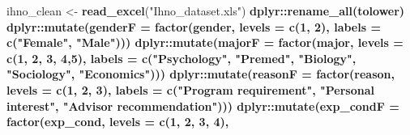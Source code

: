 \documentclass[
]{article}
\newenvironment{Shaded}{\begin{snugshade}}{\end{snugshade}}
\newcommand{\DataTypeTok}[1]{\textcolor[rgb]{0.13,0.29,0.53}{#1}}
\newcommand{\DecValTok}[1]{\textcolor[rgb]{0.00,0.00,0.81}{#1}}
\newcommand{\KeywordTok}[1]{\textcolor[rgb]{0.13,0.29,0.53}{\textbf{#1}}}
\newcommand{\NormalTok}[1]{#1}
\newcommand{\OperatorTok}[1]{\textcolor[rgb]{0.81,0.36,0.00}{\textbf{#1}}}
\newcommand{\StringTok}[1]{\textcolor[rgb]{0.31,0.60,0.02}{#1}}
\begin{document}
\begin{Shaded}
\begin{Highlighting}[]
\NormalTok{ihno_clean <-}\StringTok{ }\KeywordTok{read_excel}\NormalTok{(}\StringTok{"Ihno_dataset.xls"}\NormalTok{) }\OperatorTok{%
\StringTok{  }\NormalTok{dplyr}\OperatorTok{::}\KeywordTok{rename_all}\NormalTok{(tolower) }\OperatorTok{%
\StringTok{  }\NormalTok{dplyr}\OperatorTok{::}\KeywordTok{mutate}\NormalTok{(}\DataTypeTok{genderF =} \KeywordTok{factor}\NormalTok{(gender, }
                                 \DataTypeTok{levels =} \KeywordTok{c}\NormalTok{(}\DecValTok{1}\NormalTok{, }\DecValTok{2}\NormalTok{),}
                                 \DataTypeTok{labels =} \KeywordTok{c}\NormalTok{(}\StringTok{"Female"}\NormalTok{, }
                                            \StringTok{"Male"}\NormalTok{))) }\OperatorTok{%
\StringTok{  }\NormalTok{dplyr}\OperatorTok{::}\KeywordTok{mutate}\NormalTok{(}\DataTypeTok{majorF =} \KeywordTok{factor}\NormalTok{(major, }
                                \DataTypeTok{levels =} \KeywordTok{c}\NormalTok{(}\DecValTok{1}\NormalTok{, }\DecValTok{2}\NormalTok{, }\DecValTok{3}\NormalTok{, }\DecValTok{4}\NormalTok{,}\DecValTok{5}\NormalTok{),}
                                \DataTypeTok{labels =} \KeywordTok{c}\NormalTok{(}\StringTok{"Psychology"}\NormalTok{,}
                                           \StringTok{"Premed"}\NormalTok{,}
                                           \StringTok{"Biology"}\NormalTok{,}
                                           \StringTok{"Sociology"}\NormalTok{,}
                                           \StringTok{"Economics"}\NormalTok{))) }\OperatorTok{%
\StringTok{  }\NormalTok{dplyr}\OperatorTok{::}\KeywordTok{mutate}\NormalTok{(}\DataTypeTok{reasonF =} \KeywordTok{factor}\NormalTok{(reason,}
                                 \DataTypeTok{levels =} \KeywordTok{c}\NormalTok{(}\DecValTok{1}\NormalTok{, }\DecValTok{2}\NormalTok{, }\DecValTok{3}\NormalTok{),}
                                 \DataTypeTok{labels =} \KeywordTok{c}\NormalTok{(}\StringTok{"Program requirement"}\NormalTok{,}
                                            \StringTok{"Personal interest"}\NormalTok{,}
                                            \StringTok{"Advisor recommendation"}\NormalTok{))) }\OperatorTok{%
\StringTok{  }\NormalTok{dplyr}\OperatorTok{::}\KeywordTok{mutate}\NormalTok{(}\DataTypeTok{exp_condF =} \KeywordTok{factor}\NormalTok{(exp_cond,}
                                   \DataTypeTok{levels =} \KeywordTok{c}\NormalTok{(}\DecValTok{1}\NormalTok{, }\DecValTok{2}\NormalTok{, }\DecValTok{3}\NormalTok{, }\DecValTok{4}\NormalTok{),}
}}}}}
\end{Highlighting}
\end{Shaded}
\end{document}
